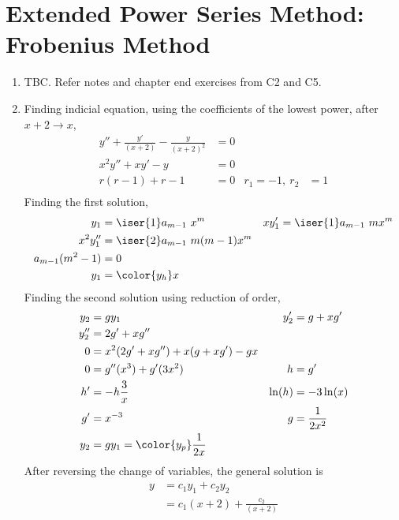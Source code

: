 \section{Extended Power Series Method: Frobenius Method}
\begin{enumerate}
    \item TBC. Refer notes and chapter end exercises from C2 and C5.

    \item Finding indicial equation, using the coefficients of the lowest power, after
          $ x+2 \rightarrow x $,
          \begin{align}
              y'' + \frac{y'}{(x+2)} - \frac{y}{(x+2)^2} & = 0   \\
              x^2y'' + xy' - y                           & = 0   \\
              r(r - 1) + r - 1                           & = 0 &
              r_1 = -1,\ r_2                             & = 1   \\
          \end{align}
          Finding the first solution,
          \begin{align}
              y_1               & = \iser{1} a_{m-1}\ x^{m}        &
              xy_1'             & = \iser{1} a_{m-1}\ m x^{m}        \\
              x^2 y_1''         & = \iser{2} a_{m-1}\ m(m-1) x^{m}   \\
              a_{m-1} (m^2 - 1) & = 0                                \\
              y_1               & = \color{y_h} x
          \end{align}
          Finding the second solution using reduction of order,
          \begin{align}
              y_2    & = gy_1                               &
              y_2'   & = g + xg'                              \\
              y_2''  & = 2g' + xg''                           \\
              0      & = x^2 (2g' + xg'') + x(g + xg') - gx   \\
              0      & = g''(x^3) + g'(3x^2)                &
              h      & = g'                                   \\
              h'     & = -h \frac{3}{x}                     &
              \ln(h) & = -3\ln(x)                             \\
              g'     & = x^{-3}                             &
              g      & = \frac{1}{2x^2}                       \\
              y_2    & = gy_1 = \color{y_p} \frac{1}{2x}
          \end{align}
          After reversing the change of variables, the general solution is
          \begin{align}
              y & = c_1 y_1 + c_2 y_2             \\
                & = c_1 (x+2) + \frac{c_2}{(x+2)}
          \end{align}


\end{enumerate}
